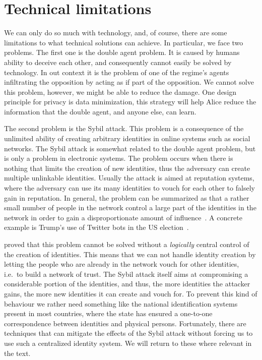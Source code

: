 \section{Technical limitations}
\label{TechnicalLimitations}

We can only do so much with technology, and, of course, there are some 
limitations to what technical solutions can achieve.
In particular, we face two problems.
The first one is the double agent problem.
It is caused by humans ability to deceive each other, and consequently cannot 
easily be solved by technology.
\label{DoubleAgentProblem}
In out context it is the problem of one of the regime's agents infiltrating the 
opposition by acting as if part of the opposition.
We cannot solve this problem, however, we might be able to reduce the damage.
One design principle for privacy is data minimization, this strategy will help 
Alice reduce the information that the double agent, and anyone else, can learn.

The second problem is the Sybil attack.
This problem is a consequence of the unlimited ability of creating arbitrary 
identities in online systems such as social networks.
\label{SybilAttacks}
The Sybil attack is somewhat related to the double agent problem, but is only 
a problem in electronic systems.
The problem occurs when there is nothing that limits the creation of new 
identities, thus the adversary can create multiple unlinkable identities.
Usually the attack is aimed at reputation systems, where the adversary can use 
its many identities to vouch for each other to falsely gain in reputation.
In general, the problem can be summarized as that a rather small number of 
people in the network control a large part of the identities in the network in 
order to gain a disproportionate amount of influence~\cite{SybilAttack}.
A concrete example is Trump's use of Twitter bots in the US 
election~\cite{BotsAndAutomationDuringUSElection}.

 proved that this problem cannot be solved without 
a \emph{logically} central control of the creation of identities.
This means that we can not handle identity creation by letting the people who 
are already in the network vouch for other identities, i.e.\ to build a network 
of trust.
The Sybil attack itself aims at compromising a considerable portion of the 
identities, and thus, the more identities the attacker gains, the more new 
identities it can create and vouch for.
To prevent this kind of behaviour we rather need something like the national 
identification systems present in most countries, where the state has ensured 
a one-to-one correspondence between identities and physical persons.
Fortunately, there are techniques that can mitigate the effects of the Sybil 
attack without forcing us to use such a centralized identity system.
We will return to these where relevant in the text.
